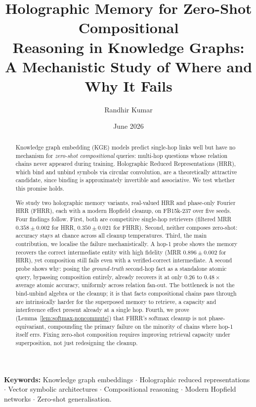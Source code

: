 \documentclass[11pt]{article}
\title{\textbf{Holographic Memory for Zero-Shot Compositional\\[2pt]
Reasoning in Knowledge Graphs:\\[4pt]
A Mechanistic Study of Where and Why It Fails}}
\author[1]{Randhir Kumar}
\affil[1]{\small Independent Researcher \\ \texttt{randhir2709vns@gmail.com}}
\date{June 2026}
\theoremstyle{definition}
\begin{document}
\maketitle

\begin{abstract}
Knowledge graph embedding (KGE) models predict single-hop links well but have
no mechanism for \emph{zero-shot compositional} queries: multi-hop questions
whose relation chains never appeared during training. Holographic Reduced
Representations (HRR), which bind and unbind symbols via circular
convolution, are a theoretically attractive candidate, since binding is
approximately invertible and associative. We test whether this promise holds.

We study two holographic memory variants, real-valued HRR and phase-only
Fourier HRR (FHRR), each with a modern Hopfield cleanup, on FB15k-237 over
five seeds. Four findings follow. First, both are competitive single-hop
retrievers (filtered MRR $0.358 \pm 0.002$ for HRR, $0.350 \pm 0.021$ for
FHRR). Second, neither composes zero-shot: accuracy stays at chance across
all cleanup temperatures. Third, the main contribution, we localise the
failure mechanistically. A hop-1 probe shows the memory recovers the correct
intermediate entity with high fidelity (MRR $0.896 \pm 0.002$ for HRR), yet
composition still fails even with a verified-correct intermediate. A second
probe shows why: posing the \emph{ground-truth} second-hop fact as a
standalone atomic query, bypassing composition entirely, already recovers it
at only $0.26$ to $0.48\times$ average atomic accuracy, uniformly across
relation fan-out. The bottleneck is not the bind-unbind algebra or the
cleanup; it is that facts compositional chains pass through are intrinsically
harder for the superposed memory to retrieve, a capacity and interference
effect present already at a single hop. Fourth, we prove
(Lemma~\ref{lem:softmax-noncommute}) that FHRR's softmax cleanup is not
phase-equivariant, compounding the primary failure on the minority of chains
where hop-1 itself errs. Fixing zero-shot composition requires improving
retrieval capacity under superposition, not just redesigning the cleanup.
\end{abstract}

\noindent\textbf{Keywords:} Knowledge graph embeddings $\cdot$ Holographic
reduced representations $\cdot$ Vector symbolic architectures $\cdot$
Compositional reasoning $\cdot$ Modern Hopfield networks $\cdot$ Zero-shot
generalisation.

\end{document}

